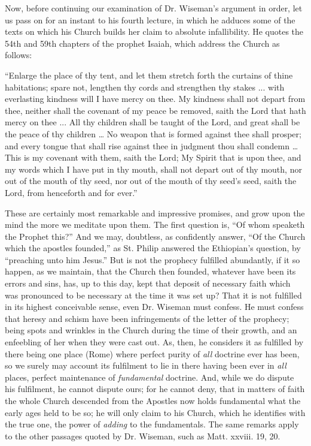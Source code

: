 Now, before
continuing our examination of Dr. Wiseman's argument in order, let us
pass on for an instant to his fourth lecture, in which he adduces some
of the texts on which his Church builds her claim to absolute
infallibility. He quotes the 54th and 59th chapters of the prophet
Isaiah, which address the Church as follows:

``Enlarge
the place of thy tent, and let them stretch forth the curtains of thine
habitations; spare not, lengthen thy cords and strengthen thy stakes ...
with everlasting kindness will I have mercy on thee. My kindness shall
not depart from thee, neither shall the covenant of my peace be removed,
saith the Lord that hath mercy on thee ... All thy children shall be
taught of the Lord, and great shall be the peace of thy children … No
weapon that is formed against thee shall prosper; and every tongue that
shall rise against thee in judgment thou shall condemn … This is my
covenant with them, saith the Lord; My Spirit that is upon thee, and my
words which I have put in thy mouth, shall not depart out of thy mouth,
nor out of the mouth of thy seed, nor out of the
mouth of thy seed's seed, saith the Lord, from henceforth and for
ever.''

These are
certainly most remarkable and impressive promises, and grow upon the
mind the more we meditate upon them. The first question is, ``Of whom
speaketh the Prophet this?'' And we may, doubtless, as confidently
answer, ``Of the Church which the apostles founded,'' as St. Philip
answered the Ethiopian's question, by ``preaching unto him Jesus.''
But is not the prophecy fulfilled abundantly, if it so happen, as we
maintain, that the Church then founded, whatever have been its errors
and sins, has, up to this day, kept that deposit of necessary faith
which was pronounced to be necessary at the time it was set up? That it
is not fulfilled in its highest conceivable sense, even Dr. Wiseman must
confess. He must confess that heresy and schism have been infringements
of the letter of the prophecy; being spots and wrinkles in the Church
during the time of their growth, and an enfeebling of her when they were
cast out. As, then, he considers it as fulfilled by there being one
place (Rome) where perfect purity of \emph{all} doctrine ever has been,
so we surely may account its fulfilment to lie in there having been ever
in \emph{all} places, perfect maintenance of \emph{fundamental}
doctrine. And, while we do dispute his fulfilment, he cannot dispute
ours; for he cannot deny, that in matters of faith the whole Church
descended from the Apostles now holds fundamental what the early ages
held to be so; he will only claim to his Church, which he identifies
with the true one, the power of \emph{adding} to the fundamentals. The
same remarks apply to the other passages quoted by Dr. Wiseman, such as
Matt. xxviii. 19, 20.

